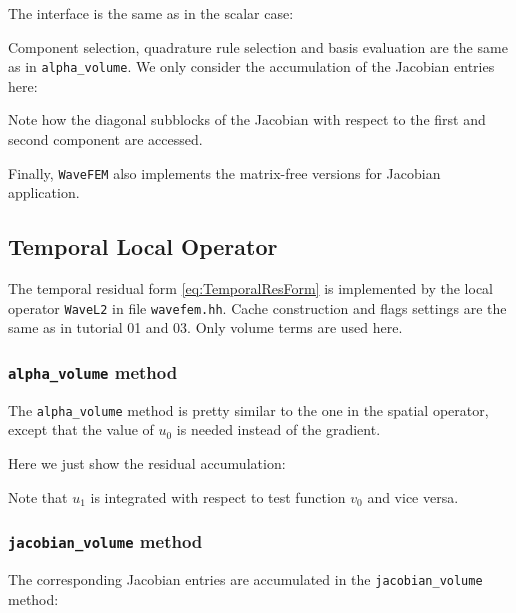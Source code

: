 \documentclass[a4paper,12pt]{article}
\begin{document}
The interface is the same as in the scalar case:


Component selection, quadrature rule selection and 
basis evaluation are the same as in \lstinline{alpha_volume}.
We only consider the accumulation of the Jacobian entries here:

Note how the diagonal subblocks of the Jacobian with respect to
the first and second component are accessed.

Finally, \lstinline{WaveFEM} also implements the matrix-free versions
for Jacobian application.

\subsection{Temporal Local Operator}


The temporal residual form \eqref{eq:TemporalResForm} is
implemented by the local operator \lstinline{WaveL2} in
file \lstinline{wavefem.hh}. Cache construction and flags settings
are the same as in tutorial 01 and 03. Only volume terms are used here.

\subsubsection*{\lstinline{alpha_volume} method}

The \lstinline{alpha_volume} method is pretty similar
to the one in the spatial operator, except that the value of $u_0$
is needed instead of the gradient.

Here we just show the residual accumulation:

Note that $u_1$ is integrated with respect to test function $v_0$
and vice versa.

\subsubsection*{\lstinline{jacobian_volume} method}

The corresponding Jacobian entries are accumulated in the 
\lstinline{jacobian_volume} method:

\end{document}
